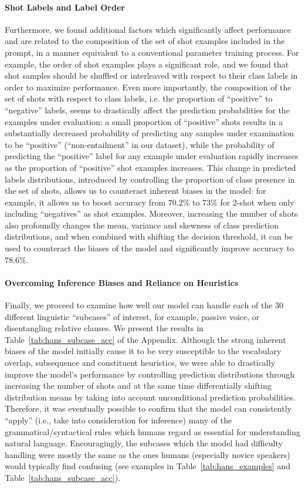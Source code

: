 \documentclass[11pt]{article}
\begin{document}
\paragraph{Shot Labels and Label Order} Furthermore, we found additional factors which significantly affect performance and are related to the composition of the set of shot examples included in the prompt, in a manner equivalent to a conventional parameter training process. For example, the order of shot examples plays a significant role, and we found that shot samples should be shuffled or interleaved with respect to their class labels in order to maximize performance. Even more importantly, the composition of the set of shots with respect to class labels, i.e. the proportion of ``positive'' to ``negative'' labels, seems to drastically affect the prediction probabilities for the examples under evaluation:
a small proportion of ``positive'' shots results in a substantially decreased probability of predicting any samples under examination to be ``positive'' (``non-entailment'' in our dataset), while the probability of predicting the ``positive'' label for any example under evaluation rapidly increases as the proportion of ``positive'' shot examples increases. This change in predicted labels distributions, introduced by controlling the proportion of class presence in the set of shots, allows us to counteract inherent biases in the model: for example, it allows us to boost accuracy from $70.2\%$ to $73\%$ for 2-shot when only including ``negatives'' as shot examples. Moreover, increasing the number of shots also profoundly changes the mean, variance and skewness of class prediction distributions, and when combined with shifting the decision threshold, it can be used to counteract the biases of the model and significantly improve accuracy to $78.6\%$.

\paragraph{Overcoming Inference Biases and Reliance on Heuristics} Finally, we proceed to examine how well our model can handle each of the 30 different linguistic ``subcases'' of interest, for example, passive voice, or disentangling relative clauses. We present the results in Table~\ref{tab:hans_subcase_acc} of the Appendix. Although the strong inherent biases of the model initially cause it to be very susceptible to the vocabulary overlap, subsequence and constituent heuristics, we were able to drastically improve the model's performance by controlling prediction distributions through increasing the number of shots and at the same time differentially shifting distribution means by taking into account unconditional prediction probabilities. Therefore, it was eventually possible to confirm that the model can consistently ``apply'' (i.e., take into consideration for inference) many of the grammatical/syntactical rules which humans regard as essential for understanding natural language. Encouragingly, the subcases which the model had difficulty handling were mostly the same as the ones humans (especially novice speakers) would typically find confusing (see examples in Table~\ref{tab:hans_examples} and Table~\ref{tab:hans_subcase_acc}).
\end{document}
